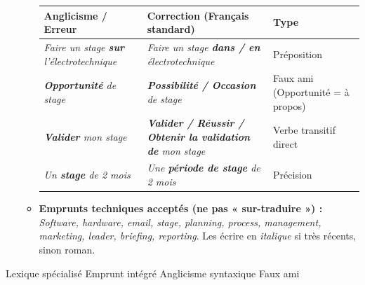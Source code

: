 \documentclass[11pt]{article}
\newcommand{\cle}[1]{{\popxbold\color{popdark}#1}}
\begin{document}
\begin{methode}
\begin{enumerate}
\begin{itemize}
        \begin{center}
            \begin{tabular}{|l|l|l|}
            \hline
            \textbf{Anglicisme / Erreur} & \textbf{Correction (Français standard)} & \textbf{Type} \\
            \hline
            \emph{Faire un stage \textbf{sur} l'électrotechnique} & \emph{Faire un stage \textbf{dans / en} électrotechnique} & Préposition \\
            \emph{\textbf{Opportunité} de stage} & \emph{\textbf{Possibilité / Occasion} de stage} & Faux ami (Opportunité = à propos) \\
            \emph{\textbf{Valider} mon stage} & \emph{\textbf{Valider / Réussir / Obtenir la validation de} mon stage} & Verbe transitif direct \\
            \emph{Un \textbf{stage} de 2 mois} & \emph{Une \textbf{période de stage} de 2 mois} & Précision \\
            \hline
            \end{tabular}
        \end{center}
        \item \textbf{Emprunts techniques acceptés (ne pas « sur-traduire ») :} \emph{Software, hardware, email, stage, planning, process, management, marketing, leader, briefing, reporting}. Les écrire en \emph{italique} si très récents, sinon roman.
    \end{itemize}
\end{enumerate}
\cle{Lexique spécialisé} \cle{Emprunt intégré} \cle{Anglicisme syntaxique} \cle{Faux ami}
\end{methode}
\end{document}
